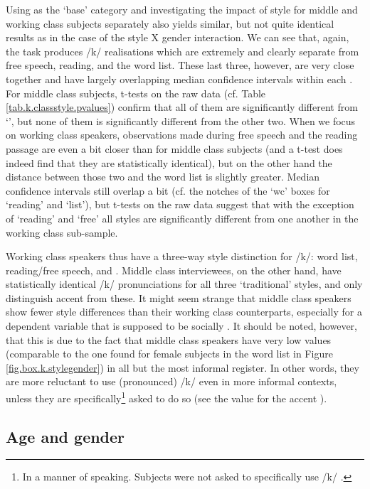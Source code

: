 Using  as the `base' category and investigating the impact of style for middle and working class subjects separately also yields similar, but not quite identical results as in the case of the style X gender interaction.
We can see that, again, the  task produces /k/ realisations which are extremely  and clearly separate from free speech, reading, and the word list.
These last three, however, are very close together and have largely overlapping median confidence intervals within each .
For middle class subjects, t-tests on the raw data (cf. Table \ref{tab.k.classstyle.pvalues}) confirm that all of them are significantly different from `', but none of them is significantly different from the other two.
When we focus on working class speakers, observations made during free speech and the reading passage are even a bit closer than for middle class subjects (and a t-test does indeed find that they are statistically identical), but on the other hand the distance between those two and the word list is slightly greater.
Median confidence intervals still overlap a bit (cf. the notches of the `wc' boxes for `reading' and `list'), but t-tests on the raw data suggest that with the exception of `reading' and `free' all styles are significantly different from one another in the working class sub-sample.

Working class speakers thus have a three-way style distinction for /k/: word list, reading/free speech, and .
Middle class interviewees, on the other hand, have statistically identical /k/ pronunciations for all three `traditional' styles, and only distinguish accent  from these.
It might seem strange that middle class speakers show fewer style differences than their working class counterparts, especially for a dependent variable that is supposed to be socially .
It should be noted, however, that this is due to the fact that middle class speakers have very low  values (comparable to the one found for female subjects in the word list in Figure \ref{fig.box.k.stylegender}) in all but the most informal register.
In other words, they are more reluctant to use (pronounced) /k/  even in more informal contexts, unless they are specifically\footnote{In a manner of speaking. Subjects were not asked to specifically use /k/ .} asked to do so (see the value for the accent ).

\subsection{Age and gender}
\label{sec.prod.res.con.k.agegender}

